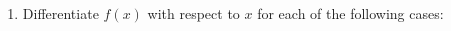 \documentclass[a4paper,12pt]{article}
\begin{document}
\begin{enumerate}
%
\item Differentiate $f(x)$ with respect to $x$ for each of the following cases:
				\begin{multicols}{2}
					\begin{enumerate}[(a)]
						

\end{enumerate}
\end{multicols}
\end{enumerate}
\end{document}
